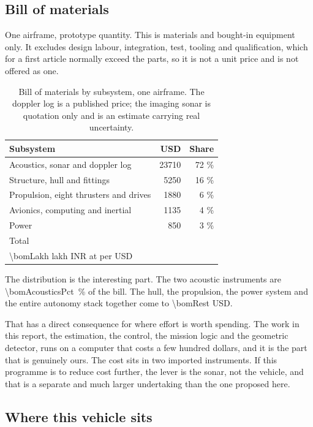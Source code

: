 \documentclass[10pt,a4paper]{article}
\begin{document}
\subsection{Bill of materials}

One airframe, prototype quantity. This is materials and bought-in equipment
only. It excludes design labour, integration, test, tooling and qualification,
which for a first article normally exceed the parts, so it is not a unit price
and is not offered as one.

\begin{table}[htbp]\centering\small
\caption{Bill of materials by subsystem, one airframe. The doppler log is a
published price; the imaging sonar is quotation only and is an estimate
carrying real uncertainty.}
\begin{tabular}{lrr}
\toprule
\textbf{Subsystem} & \textbf{USD} & \textbf{Share} \\
\midrule
Acoustics, sonar and doppler log & \num{23710} & 72 \% \\
Structure, hull and fittings & \num{5250} & 16 \% \\
Propulsion, eight thrusters and drives & \num{1880} & 6 \% \\
Avionics, computing and inertial & \num{1135} & 4 \% \\
Power & \num{850} & 3 \% \\
\midrule
Total & \bomTotal{} & \\
\multicolumn{3}{l}{\SI{\bomLakh}{} lakh INR at \bomRate{} per USD} \\
\bottomrule
\end{tabular}
\end{table}

The distribution is the interesting part. The two acoustic instruments are
\SI{\bomAcousticsPct}{\percent} of the bill. The hull, the propulsion, the
power system and the entire autonomy stack together come to
\SI{\bomRest}{} USD.

That has a direct consequence for where effort is worth spending. The work in
this report, the estimation, the control, the mission logic and the geometric
detector, runs on a computer that costs a few hundred dollars, and it is the
part that is genuinely ours. The cost sits in two imported instruments. If this
programme is to reduce cost further, the lever is the sonar, not the vehicle,
and that is a separate and much larger undertaking than the one proposed here.

\subsection{Where this vehicle sits}
\end{document}
